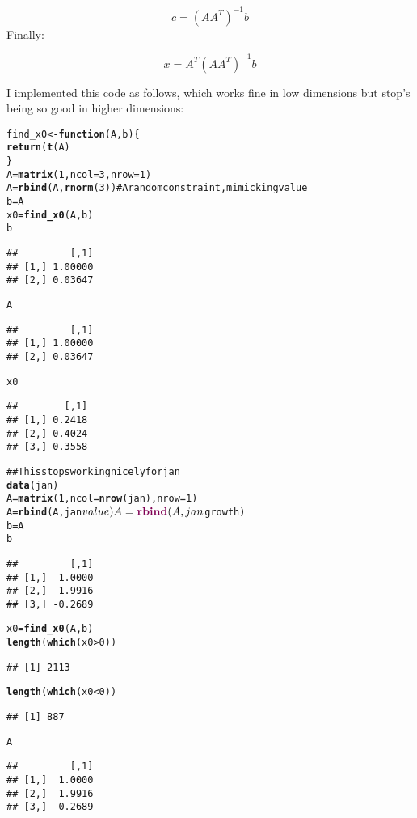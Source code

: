 \documentclass{article}\usepackage{graphicx, color}
\makeatletter
\newcommand{\hlfunctioncall}[1]{\textcolor[rgb]{0.501960784313725,0,0.329411764705882}{\textbf{#1}}}%
\newcommand{\hlcomment}[1]{\textcolor[rgb]{0.180392156862745,0.6,0.341176470588235}{#1}}%
\newenvironment{kframe}{%
 \def\at@end@of@kframe{}%
 \ifinner\ifhmode%
  \def\at@end@of@kframe{\end{minipage}}%
  \begin{minipage}{\columnwidth}%
 \fi\fi%
 \def\FrameCommand##1{\hskip\@totalleftmargin \hskip-\fboxsep
 \colorbox{shadecolor}{##1}\hskip-\fboxsep
     \hskip-\linewidth \hskip-\@totalleftmargin \hskip\columnwidth}%
 \MakeFramed {\advance\hsize-\width
   \@totalleftmargin\z@ \linewidth\hsize
   \@setminipage}}%
 {\par\unskip\endMakeFramed%
 \at@end@of@kframe}
\newenvironment{knitrout}{}{} %
\makeatother
\begin{document}
$$ c = (AA^T)^{-1}b $$
Finally:

$$ x = A^T(AA^T)^{-1}b$$

\noindent
I implemented this code as follows, which works fine in low dimensions
but stop's being so good in higher dimensions:

\begin{knitrout}
\color{fgcolor}\begin{kframe}
\begin{alltt}
find_x0 <- \hlfunctioncall{function}(A, b) \{
    \hlfunctioncall{return}(\hlfunctioncall{t}(A) %*% \hlfunctioncall{solve}(A %*% \hlfunctioncall{t}(A)) %*% b)
\}
A = \hlfunctioncall{matrix}(1, ncol = 3, nrow = 1)
A = \hlfunctioncall{rbind}(A, \hlfunctioncall{rnorm}(3))  \hlcomment{# A random constraint, mimicking value}
b = A %*% \hlfunctioncall{c}(0.2, 0.3, 0.5)
x0 = \hlfunctioncall{find_x0}(A, b)
b
\end{alltt}
\begin{verbatim}
##         [,1]
## [1,] 1.00000
## [2,] 0.03647
\end{verbatim}
\begin{alltt}
A %*% x0
\end{alltt}
\begin{verbatim}
##         [,1]
## [1,] 1.00000
## [2,] 0.03647
\end{verbatim}
\begin{alltt}
x0
\end{alltt}
\begin{verbatim}
##        [,1]
## [1,] 0.2418
## [2,] 0.4024
## [3,] 0.3558
\end{verbatim}
\begin{alltt}

\hlcomment{## This stops working nicely for jan}
\hlfunctioncall{data}(jan)
A = \hlfunctioncall{matrix}(1, ncol = \hlfunctioncall{nrow}(jan), nrow = 1)
A = \hlfunctioncall{rbind}(A, jan$value)
A = \hlfunctioncall{rbind}(A, jan$growth)
b = A %*% jan$portfolio
b
\end{alltt}
\begin{verbatim}
##         [,1]
## [1,]  1.0000
## [2,]  1.9916
## [3,] -0.2689
\end{verbatim}
\begin{alltt}
x0 = \hlfunctioncall{find_x0}(A, b)
\hlfunctioncall{length}(\hlfunctioncall{which}(x0 > 0))
\end{alltt}
\begin{verbatim}
## [1] 2113
\end{verbatim}
\begin{alltt}
\hlfunctioncall{length}(\hlfunctioncall{which}(x0 < 0))
\end{alltt}
\begin{verbatim}
## [1] 887
\end{verbatim}
\begin{alltt}
A %*% x0
\end{alltt}
\begin{verbatim}
##         [,1]
## [1,]  1.0000
## [2,]  1.9916
## [3,] -0.2689
\end{verbatim}
\end{kframe}
\end{knitrout}
\end{document}
